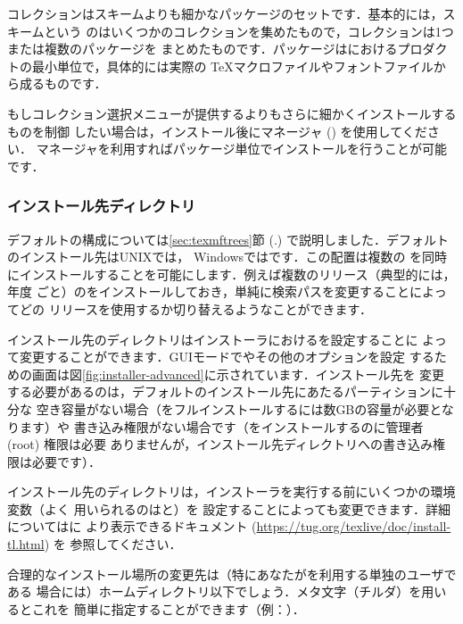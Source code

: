 \documentclass[uplatex,dvipdfmx,tombow]{jsarticle}
\begin{document}
コレクションはスキームよりも細かなパッケージのセットです．基本的には，スキームという
のはいくつかのコレクションを集めたもので，コレクションは1つまたは複数のパッケージを
まとめたものです．パッケージは\TL におけるプロダクトの最小単位で，具体的には実際の
\TeX マクロファイルやフォントファイルから成るものです．

もしコレクション選択メニューが提供するよりもさらに細かくインストールするものを制御
したい場合は，インストール後に\TL マネージャ () を使用してください．
\TL マネージャを利用すればパッケージ単位でインストールを行うことが可能です．

\subsubsection{インストール先ディレクトリ}
\label{sec:directories}

デフォルトの\TL 構成については\ref{sec:texmftrees}節 (\p.\pageref{sec:texmftrees})
で説明しました．デフォルトのインストール先はUNIXでは，
Windowsではです．この配置は複数の\TL
を同時にインストールすることを可能にします．例えば複数のリリース（典型的には，年度
ごと）の\TL をインストールしておき，単純に検索パスを変更することによってどの
リリースを使用するか切り替えるようなことができます．

インストール先のディレクトリはインストーラにおけるを設定することに
よって変更することができます．GUIモードでやその他のオプションを設定
するための画面は図\ref{fig:installer-advanced}に示されています．インストール先を
変更する必要があるのは，デフォルトのインストール先にあたるパーティションに十分な
空き容量がない場合（\TL をフルインストールするには数GBの容量が必要となります）や
書き込み権限がない場合です（\TL をインストールするのに管理者 (root) 権限は必要
ありませんが，インストール先ディレクトリへの書き込み権限は必要です）．

インストール先のディレクトリは，インストーラを実行する前にいくつかの環境変数（よく
用いられるのはと）を
設定することによっても変更できます．詳細についてはに
より表示できるドキュメント (\url{https://tug.org/texlive/doc/install-tl.html}) を
参照してください．

合理的なインストール場所の変更先は（特にあなたが\TL を利用する単独のユーザである
場合には）ホームディレクトリ以下でしょう．メタ文字\dir{~}（チルダ）を用いるとこれを
簡単に指定することができます（例：）．
\end{document}
